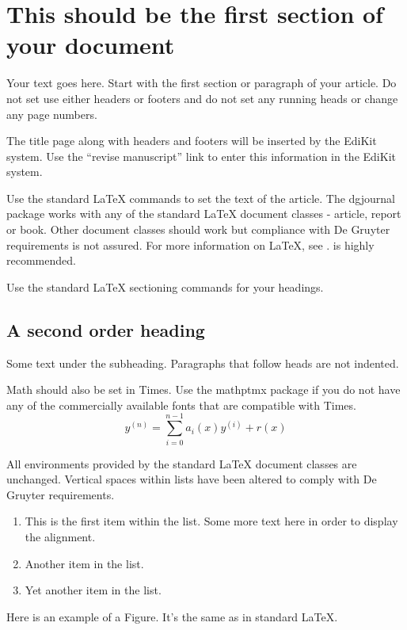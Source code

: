 \documentclass[letterpaper,12pt]{article}
\begin{document}
\section{This should be the first section of your document}

Your text goes here. Start with the first section or paragraph of your
article. Do not set use either headers or footers and do not set any running
heads or change any page numbers.

The title page along with headers and footers will be inserted by the EdiKit
system. Use the ``revise manuscript'' link to enter this information in the
EdiKit system.

Use the standard LaTeX commands to set the text of the article. The dgjournal
package works with any of the standard LaTeX document classes - article, report
or book. Other document classes should work but compliance with De Gruyter
requirements is not assured. For more information on LaTeX, see
\cite{lamport,mittelbach,oetiker}. \cite{mittelbach} is highly recommended.

Use the standard LaTeX sectioning commands for your headings.

\subsection{A second order heading}

Some text under the subheading. Paragraphs that follow heads are not
indented.

Math should also be set in Times. Use the mathptmx package if you do not have
any of the commercially available fonts that are compatible with Times.
\begin{equation}
    y^{(n)} = \sum_{i=0}^{n-1} a_i(x) y^{(i)} + r(x) 
\end{equation}

All environments provided by the standard LaTeX document classes are
unchanged. Vertical spaces within lists have been altered to comply with De Gruyter
requirements.
\begin{enumerate}
\item This is the first item within the list. Some more text here in order to
  display the alignment.
\item Another item in the list.
\item Yet another item in the list.
\end{enumerate}

Here is an example of a Figure. It's the same as in standard LaTeX.
\end{document}
